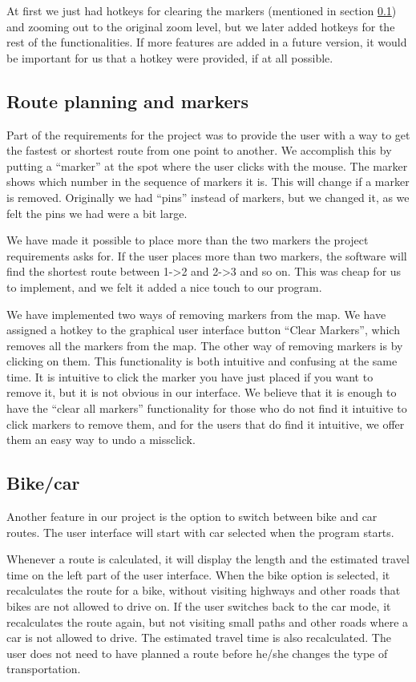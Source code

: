 At first we just had hotkeys for clearing the markers (mentioned in section
\ref{UIA-IF-M}) and zooming out to the original zoom level, but we later added
hotkeys for the rest of the functionalities. If more features are added in a
future version, it would be important for us that a hotkey were provided, if at
all possible.

\subsection{Route planning and markers}
\label{UIA-IF-M}
Part of the requirements for the project was to provide the user with a way to
get the fastest or shortest route from one point to another. We accomplish this
by putting a ``marker'' at the spot where the user clicks with the mouse. The
marker shows which number in the sequence of markers it is. This will change 
if a marker is removed. Originally we had ``pins'' instead of markers, but we 
changed it, as we felt the pins we had were a bit large.

We have made it possible to place more than the two markers the project
requirements asks for. If the user places more than two markers, the software
will find the shortest route between 1-\textgreater 2 and 2-\textgreater 3 and
so on. This was cheap for us to implement, and we felt it added a nice touch to our program. 

We have implemented two ways of removing markers from the map. We have assigned
a hotkey to the graphical user interface button ``Clear Markers'', which removes 
all the markers from the map. The other way of removing markers is by clicking
on them. This functionality is both intuitive and confusing at the same time. It is
intuitive to click the marker you have just placed if you want to remove it, but
it is not obvious in our interface. We believe that it is enough to have the
``clear all markers'' functionality for those who do not find it intuitive to
click markers to remove them, and for the users that do find it intuitive, we
offer them an easy way to undo a missclick.

\subsection{Bike/car}
\label{UIA-IF-BC}
Another feature in our  project is the option
to switch between bike and car routes. The user interface will start with car
selected when the program starts.

Whenever a route is calculated, it will display the length and the estimated
travel time on the left part of the user interface. When the bike option is selected, 
it recalculates the route for a bike, without visiting highways and other roads 
that bikes are not allowed to drive on. If the user switches back to the 
car mode, it recalculates the route again, but not visiting small paths and other 
roads where a car is not allowed to drive. The estimated travel time is also 
recalculated. The user does not need to have planned a route before he/she 
changes the type of transportation.


